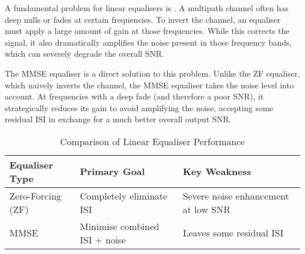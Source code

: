A fundamental problem for linear equalisers is . A multipath channel often has deep nulls or fades at certain frequencies. To invert the channel, an equaliser must apply a large amount of gain at those frequencies. While this corrects the signal, it also dramatically amplifies the noise present in those frequency bands, which can severely degrade the overall SNR.

The MMSE equaliser is a direct solution to this problem. Unlike the ZF equaliser, which naively inverts the channel, the MMSE equaliser takes the noise level into account. At frequencies with a deep fade (and therefore a poor SNR), it strategically reduces its gain to avoid amplifying the noise, accepting some residual ISI in exchange for a much better overall output SNR.

\begin{table}[H]
    \centering
    \caption{Comparison of Linear Equaliser Performance}
    \label{tab:equaliser-comparison}
    \begin{tabular}{@{}lll@{}}
        \toprule
        \tableheaderfont Equaliser Type & \tableheaderfont Primary Goal & \tableheaderfont Key Weakness \\
        \midrule
        Zero-Forcing (ZF) & Completely eliminate ISI & Severe noise enhancement at low SNR \\
        MMSE & Minimise combined ISI + noise & Leaves some residual ISI \\
        \bottomrule
    \end{tabular}
\end{table}


